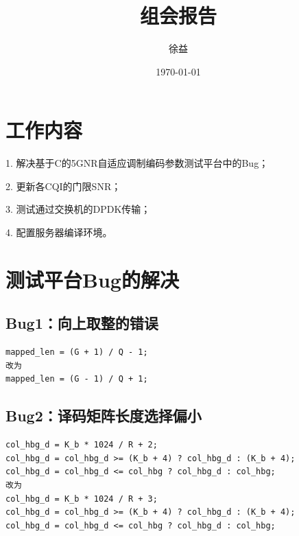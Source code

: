 \documentclass{article}
\title{组会报告}
\author{徐益}
\date{\today}
\begin{document}
\maketitle


\section{工作内容} 
1. 解决基于C的5GNR自适应调制编码参数测试平台中的Bug；

2. 更新各CQI的门限SNR；

3. 测试通过交换机的DPDK传输；

4. 配置服务器编译环境。

\section{测试平台Bug的解决}
\subsection{Bug1：向上取整的错误}
\lstset{language=C++}
\begin{lstlisting}
mapped_len = (G + 1) / Q - 1;
改为
mapped_len = (G - 1) / Q + 1;
\end{lstlisting}
\subsection{Bug2：译码矩阵长度选择偏小}
\lstset{language=C++}
\begin{lstlisting}
col_hbg_d = K_b * 1024 / R + 2;
col_hbg_d = col_hbg_d >= (K_b + 4) ? col_hbg_d : (K_b + 4);
col_hbg_d = col_hbg_d <= col_hbg ? col_hbg_d : col_hbg;
改为
col_hbg_d = K_b * 1024 / R + 3;
col_hbg_d = col_hbg_d >= (K_b + 4) ? col_hbg_d : (K_b + 4);
col_hbg_d = col_hbg_d <= col_hbg ? col_hbg_d : col_hbg;
\end{lstlisting}
\end{document}
